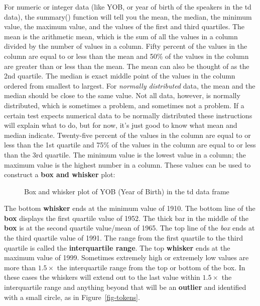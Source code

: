 \documentclass[
  10pt,
  letterpaper]{article}
\renewcommand\texttt[1]{{\ttfamily\color{BrickRed}#1}}
\begin{document}
For \texttt{numeric} or \texttt{integer} data (like \texttt{YOB}, or
year of birth of the speakers in the \texttt{td} data), the
\texttt{summary()} function will tell you the mean, the median, the
minimum value, the maximum value, and the values of the first and third
quartiles. The mean is the arithmetic mean, which is the sum of all the
values in a column divided by the number of values in a column. Fifty
percent of the values in the column are equal to or less than the mean
and 50\% of the values in the column are greater than or less than the
mean. The mean can also be thought of as the 2nd quartile. The median is
exact middle point of the values in the column ordered from smallest to
largest. For \emph{normally distributed} data, the mean and the median
should be close to the same value. Not all data, however, is normally
distributed, which is sometimes a problem, and sometimes not a problem.
If a certain test expects numerical data to be normally distributed
these instructions will explain what to do, but for now, it's just good
to know what mean and median indicate. Twenty-five percent of the values
in the column are equal to or less than the 1st quartile and 75\% of the
values in the column are equal to or less than the 3rd quartile. The
minimum value is the lowest value in a column; the maximum value is the
highest number in a column. These values can be used to construct a
\textbf{box and whisker} plot:

\begin{figure}

{\centering \texttt{[image: 030\_lvcr\_files/figure-pdf/fig-yob-1.pdf]}

}

\caption{\label{fig-yob}Box and whisker plot of \texttt{YOB} (Year of
Birth) in the \texttt{td} data frame}

\end{figure}

The bottom \textbf{whisker} ends at the minimum value of 1910. The
bottom line of the \textbf{box} displays the first quartile value of
1952. The thick bar in the middle of the \textbf{box} is at the second
quartile value/mean of 1965. The top line of the \emph{box} ends at the
third quartile value of 1991. The range from the first quartile to the
third quartile is called the \textbf{interquartile range}. The top
\textbf{whisker} ends at the maximum value of 1999. Sometimes extremely
high or extremely low values are more than \(1.5\times\) the
interquartile range from the top or bottom of the box. In these cases
the whiskers will extend out to the last value within \(1.5\times\) the
interquartile range and anything beyond that will be an \textbf{outlier}
and identified with a small circle, as in Figure~\ref{fig-tokens}.
\end{document}
